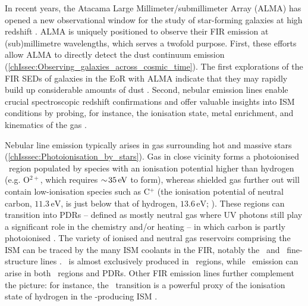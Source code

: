 In recent years, the Atacama Large Millimeter/submillimeter Array (ALMA) has opened a new observational window for the study of star-forming galaxies at high redshift \citep[see][ for a review]{2020RSOS....700556H}. ALMA is uniquely positioned to observe their FIR emission at (sub)millimetre wavelengths, which serves a twofold purpose. First, these efforts allow ALMA to directly detect the dust continuum emission (\cref{chIssec:Observing_galaxies_across_cosmic_time}). The first explorations of the FIR SEDs of galaxies in the EoR with ALMA indicate that they may rapidly build up considerable amounts of dust \citep[e.g.][]{2015Natur.519..327W, 2017ApJ...837L..21L}. Second, nebular emission lines enable crucial spectroscopic redshift confirmations and offer valuable insights into ISM conditions by probing, for instance, the ionisation state, metal enrichment, and kinematics of the gas \citep[\cref{chIssec:Nebular_emission_and_emission-line_diagnostics}; see][ for a review]{2019ARA&A..57..511K}.

Nebular line emission typically arises in gas surrounding hot and massive stars (\cref{chIsssec:Photoionisation_by_stars}). Gas in close vicinity forms a photoionised \HII\ region populated by species with an ionisation potential higher than hydrogen (e.g. O$^{2+}$, which requires $\sim \! 35 \, \mathrm{eV}$ to form), whereas shielded gas further out will contain low-ionisation species such as C$^+$ (the ionisation potential of neutral carbon, $11.3 \, \mathrm{eV}$, is just below that of hydrogen, $13.6 \, \mathrm{eV}$; \citealt{2005AAS...207.8117A}). These regions can transition into PDRs -- defined as mostly neutral gas where UV photons still play a significant role in the chemistry and/or heating -- in which carbon is partly photoionised \citep[instead of hydrogen, as in \HII\ regions;][]{1999RvMP...71..173H}. The variety of ionised and neutral gas reservoirs comprising the ISM can be traced by the many ISM coolants in the FIR, notably the \CIILam\ and \OIIILam\ fine-structure lines \citep[\CII\ and \OIIIf\ hereafter; see e.g.][]{2019PASJ...71...71H, 2019MNRAS.487.5902K, 2019MNRAS.487.1689P, 2020ApJ...896...93H, 2022ApJ...931..160B}. \OIIIf\ is almost exclusively produced in \HII\ regions, while \CII\ emission can arise in both \HII\ regions and PDRs. Other FIR emission lines further complement the picture: for instance, the \NIILam\ transition is a powerful proxy of the ionisation state of hydrogen in the \CII-producing ISM \citep[e.g.][]{2012A&A...542L..34N, 2014ApJ...782L..17D}.

